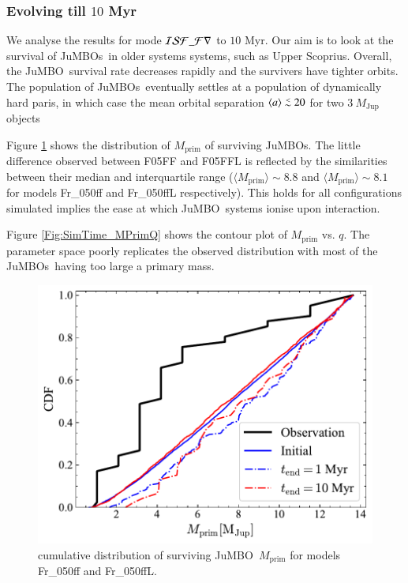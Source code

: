 \documentclass[submission,phys]{lib/SciPost}
\def\aplt{\ {\raise-.5ex\hbox{$\buildrel<\over\sim$}}\ }
\newcommand{\jumbo}{\mbox{JuMBO}}
\newcommand{\jumbos}{\mbox{JuMBOs}}
\begin{document}
\subsubsection{Evolving till $10$ Myr}

We analyse the results for mode ${\cal ISF\_Fr}$ to $10$ Myr.  Our aim
is to look at the survival of \jumbos\, in older systems systems, such
as Upper Scoprius. Overall, the \jumbo\, survival rate decreases
rapidly and the survivers have tighter orbits.  The population of
\jumbos\, eventually settles at a population of dynamically hard
paris, in which case the mean orbital separation $\langle a\rangle
\aplt 20$ for two $3\ M_{\mathrm{Jup}}$ objects
        
Figure \ref{Fig:Mdistr_SimTime} shows the distribution of
$M_{\mathrm{prim}}$ of surviving \jumbos. The little difference
observed between F05FF and F05FFL is reflected by the similarities
between their median and interquartile range ($\langle
M_{\mathrm{prim}}\rangle\sim 8.8$ and $\langle
M_{\mathrm{prim}}\rangle \sim 8.1$ for models Fr\_050ff and Fr\_050ffL
respectively). This holds for all configurations simulated implies the
ease at which \jumbo\, systems ionise upon interaction.

Figure \ref{Fig:SimTime_MPrimQ} shows the contour plot of
$M_{\mathrm{prim}}$ vs. $q$. The parameter space poorly replicates the
observed distribution with most of the \jumbos\, having too large a
primary mass.
   
\begin{figure}
    \centering
        \includegraphics[width=\columnwidth]{figures/SimTime_mprim_vs_obs_.pdf}
    \caption{cumulative distribution of surviving \jumbo\,
      $M_{\mathrm{prim}}$ for models Fr\_050ff and Fr\_050ffL.}
         \label{Fig:Mdistr_SimTime}
\end{figure}
   
\end{document}
